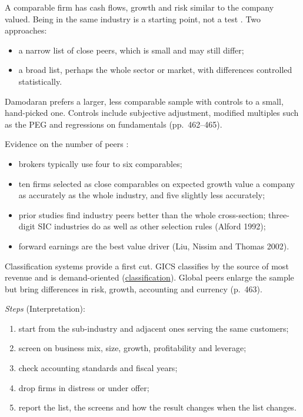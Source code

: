 \begin{qfmethod}\label{meth:peer-group-selection}
 A comparable firm has cash flows, growth and risk similar to the company valued. Being in the same industry is a starting point, not a test \citep[pp.~462--463]{investment-valuation-2012}. Two approaches:
\begin{itemize}
\item a narrow list of close peers, which is small and may still differ;
\item a broad list, perhaps the whole sector or market, with differences controlled statistically.
\end{itemize}
Damodaran prefers a larger, less comparable sample with controls to a small, hand-picked one. Controls include subjective adjustment, modified multiples such as the PEG and regressions on fundamentals (pp.~462--465).

Evidence on the number of peers \citep[pp.~1--5]{optimal-multiples-2023}:
\begin{itemize}
\item brokers typically use four to six comparables;
\item ten firms selected as close comparables on expected growth value a company as accurately as the whole industry, and five slightly less accurately;
\item prior studies find industry peers better than the whole cross-section; three-digit SIC industries do as well as other selection rules (Alford 1992);
\item forward earnings are the best value driver (Liu, Nissim and Thomas 2002).
\end{itemize}

Classification systems provide a first cut. GICS classifies by the source of most revenue and is demand-oriented (\hyperref[meth:industry-analysis]{classification}). Global peers enlarge the sample but bring differences in risk, growth, accounting and currency (p.~463).

\emph{Steps} (Interpretation):
\begin{enumerate}
\item start from the sub-industry and adjacent ones serving the same customers;
\item screen on business mix, size, growth, profitability and leverage;
\item check accounting standards and fiscal years;
\item drop firms in distress or under offer;
\item report the list, the screens and how the result changes when the list changes.
\end{enumerate}


\end{qfmethod}
